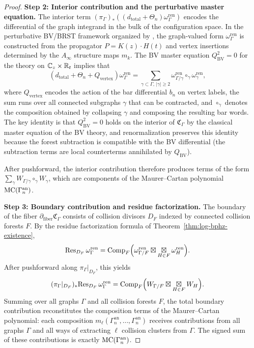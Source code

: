 \begin{proof}
\medskip
\textbf{Step 2: Interior contribution and the perturbative master equation.}
The interior term $(\pi_\Gamma)_* ((d_{\mathrm{total}} + \Theta_n)\omega_\Gamma^{\mathrm{ren}})$ encodes the differential of the graph integrand in the bulk of the configuration space. In the perturbative BV/BRST framework organized by \cite{GKW25}, the graph-valued form $\omega_\Gamma^{\mathrm{ren}}$ is constructed from the propagator $P = K(z) \cdot H(t)$ and vertex insertions determined by the $A_\infty$ structure maps $m_k$. The BV master equation $Q_{\mathrm{BV}}^2 = 0$ for the theory on $\mathbb C_z \times \mathbb R_t$ implies that
\[
 (d_{\mathrm{total}} + \Theta_n + Q_{\mathrm{vertex}})\omega_\Gamma^{\mathrm{ren}}
 =
 \sum_{\gamma \subset \Gamma,\, |\gamma| \ge 2}
 \omega_{\Gamma/\gamma}^{\mathrm{ren}} \circ_\gamma \omega_\gamma^{\mathrm{ren}},
\]
where $Q_{\mathrm{vertex}}$ encodes the action of the bar differential $b_n$ on vertex labels, the sum runs over all connected subgraphs $\gamma$ that can be contracted, and $\circ_\gamma$ denotes the composition obtained by collapsing $\gamma$ and composing the resulting bar words. The key identity is that $Q_{\mathrm{BV}}^2 = 0$ holds on the interior of $\mathfrak C_\Gamma$ by the classical master equation of the BV theory, and renormalization preserves this identity because the forest subtraction is compatible with the BV differential (the subtraction terms are local counterterms annihilated by $Q_{\mathrm{BV}}$).

After pushforward, the interior contribution therefore produces terms of the form $\sum_\gamma W_{\Gamma/\gamma} \circ_\gamma W_\gamma$, which are components of the Maurer--Cartan polynomial $\mathrm{MC}(\Gamma_n^{\mathrm{an}})$.

\medskip
\textbf{Step 3: Boundary contribution and residue factorization.}
The boundary of the fiber $\partial_{\mathrm{fiber}} \mathfrak C_\Gamma$ consists of collision divisors $D_F$ indexed by connected collision forests $F$. By the residue factorization formula of Theorem~\ref{thm:log-bphz-existence},
\[
 \mathrm{Res}_{D_F}\, \omega_\Gamma^{\mathrm{ren}}
 =
 \mathrm{Comp}_F\Big(
 \omega_{\Gamma/F}^{\mathrm{ren}}
 \boxtimes
 \mathop{\boxtimes}\displaylimits_{H \in F} \omega_H^{\mathrm{ren}}
 \Big).
\]
After pushforward along $\pi_\Gamma|_{D_F}$, this yields
\[
 (\pi_\Gamma|_{D_F})_* \mathrm{Res}_{D_F}\, \omega_\Gamma^{\mathrm{ren}}
 =
 \mathrm{Comp}_F\Big(
 W_{\Gamma/F}
 \boxtimes
 \mathop{\boxtimes}\displaylimits_{H \in F} W_H
 \Big).
\]
Summing over all graphs $\Gamma$ and all collision forests $F$, the total boundary contribution reconstitutes the composition terms of the Maurer--Cartan polynomial: each composition $m_\ell(\Gamma_n^{\mathrm{an}}, \ldots, \Gamma_n^{\mathrm{an}})$ receives contributions from all graphs $\Gamma$ and all ways of extracting $\ell$ collision clusters from $\Gamma$. The signed sum of these contributions is exactly $\mathrm{MC}(\Gamma_n^{\mathrm{an}})$.


\end{proof}
